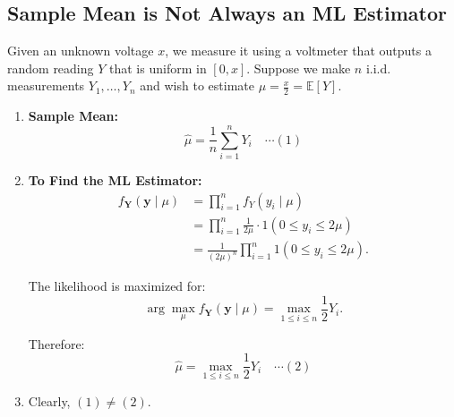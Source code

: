 \subsection{Sample Mean is Not Always an ML Estimator}
\begin{example}
    Given an unknown voltage \( x \), we measure it using a voltmeter that outputs a random reading \( Y \) that is uniform in \( [0, x] \). Suppose we make \( n \) i.i.d. measurements \( Y_1, \dots, Y_n \) and wish to estimate \( \mu = \frac{x}{2} = \mathbb{E}[Y] \).
    \begin{enumerate}
        \item \textbf{Sample Mean:} 
        \[
        \hat{\mu} = \frac{1}{n} \sum_{i=1}^n Y_i \quad \cdots (1)
        \]

        \item \textbf{To Find the ML Estimator:}
        \begin{align*}
            f_{\mathbf{Y}}(\mathbf{y} \mid \mu) &= \prod_{i=1}^n f_Y(y_i \mid \mu) \\
            &= \prod_{i=1}^n \frac{1}{2\mu} \cdot 1(0 \leq y_i \leq 2\mu) \\
            &= \frac{1}{(2\mu)^n} \prod_{i=1}^n 1(0 \leq y_i \leq 2\mu).
        \end{align*}
        
        The likelihood is maximized for:
        \[
        \arg\max_{\mu} f_{\mathbf{Y}}(\mathbf{y} \mid \mu) = \max_{1 \leq i \leq n} \frac{1}{2} Y_i.
        \]

        Therefore:
        \[
        \hat{\mu} = \max_{1 \leq i \leq n} \frac{1}{2} Y_i \quad \cdots (2)
        \]

        \item Clearly, \( (1) \neq (2) \).
    \end{enumerate}
\end{example}

